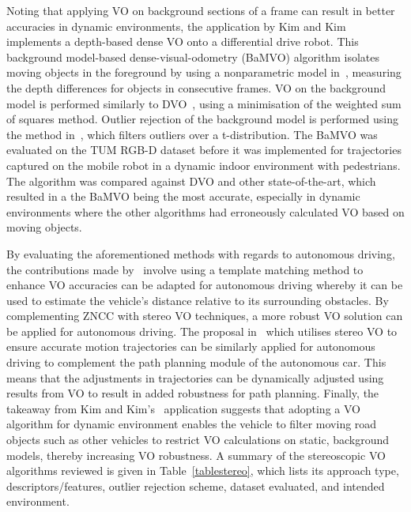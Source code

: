 Noting that applying VO on background sections of a frame can result in better accuracies in dynamic environments, the application by Kim and Kim~\cite{kim_effective_2016} implements a depth-based dense VO onto a differential drive robot. This background model-based dense-visual-odometry (BaMVO) algorithm isolates moving objects in the foreground by using a nonparametric model in~\cite{elgammal_non-parametric_2000}, measuring the depth differences for objects in consecutive frames. VO on the background model is performed similarly to DVO~\cite{steinbrucker_real-time_2011}, using a minimisation of the weighted sum of squares method. Outlier rejection of the background model is performed using the method in~\cite{kerl_robust_2013}, which filters outliers over a t-distribution. The BaMVO was evaluated on the TUM RGB-D dataset before it was implemented for trajectories captured on the mobile robot in a dynamic indoor environment with pedestrians. The algorithm was compared against DVO and other state-of-the-art, which resulted in a the BaMVO being the most accurate, especially in dynamic environments where the other algorithms had erroneously calculated VO based on moving objects. 

By evaluating the aforementioned methods with regards to autonomous driving, the contributions made by~\cite{kunii_mobile_2017} involve using a template matching method to enhance VO accuracies can be adapted for autonomous driving whereby it can be used to estimate the vehicle's distance relative to its surrounding obstacles. By complementing ZNCC with stereo VO techniques, a more robust VO solution can be applied for autonomous driving. The proposal in~\cite{sun_sequentially_2017} which utilises stereo VO to ensure accurate motion trajectories can be similarly applied for autonomous driving to complement the path planning module of the autonomous car. This means that the adjustments in trajectories can be dynamically adjusted using results from VO to result in added robustness for path planning. Finally, the takeaway from Kim and Kim's~\cite{kim_effective_2016} application suggests that adopting a VO algorithm for dynamic environment enables the vehicle to filter moving road objects such as other vehicles to restrict VO calculations on static, background models, thereby increasing VO robustness. A summary of the stereoscopic VO algorithms reviewed is given in Table~\ref{tablestereo}, which lists its approach type, descriptors/features, outlier rejection scheme, dataset evaluated, and intended environment. 

